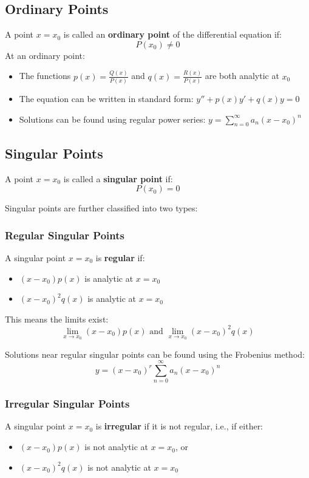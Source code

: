 \subsection{Ordinary Points}
A point $x = x_0$ is called an \textbf{ordinary point} of the differential equation if:
\[P(x_0) \neq 0\]
At an ordinary point:
\begin{itemize}
    \item The functions $p(x) = \frac{Q(x)}{P(x)}$ and $q(x) = \frac{R(x)}{P(x)}$ are both analytic at $x_0$
    \item The equation can be written in standard form: $y'' + p(x)y' + q(x)y = 0$
    \item Solutions can be found using regular power series: $y = \sum_{n=0}^{\infty} a_n(x-x_0)^n$
\end{itemize}

\subsection{Singular Points}
A point $x = x_0$ is called a \textbf{singular point} if:
\[P(x_0) = 0\]

Singular points are further classified into two types:

\subsubsection{Regular Singular Points}
A singular point $x = x_0$ is \textbf{regular} if:
\begin{itemize}
    \item $(x-x_0)p(x)$ is analytic at $x = x_0$
    \item $(x-x_0)^2q(x)$ is analytic at $x = x_0$
\end{itemize}

This means the limits exist:
\[\lim_{x \to x_0} (x-x_0)p(x) \text{ and } \lim_{x \to x_0} (x-x_0)^2q(x)\]

Solutions near regular singular points can be found using the Frobenius method:
\[y = (x-x_0)^r\sum_{n=0}^{\infty} a_n(x-x_0)^n\]

\subsubsection{Irregular Singular Points}
A singular point $x = x_0$ is \textbf{irregular} if it is not regular, i.e., if either:
\begin{itemize}
    \item $(x-x_0)p(x)$ is not analytic at $x = x_0$, or
    \item $(x-x_0)^2q(x)$ is not analytic at $x = x_0$
\end{itemize}

